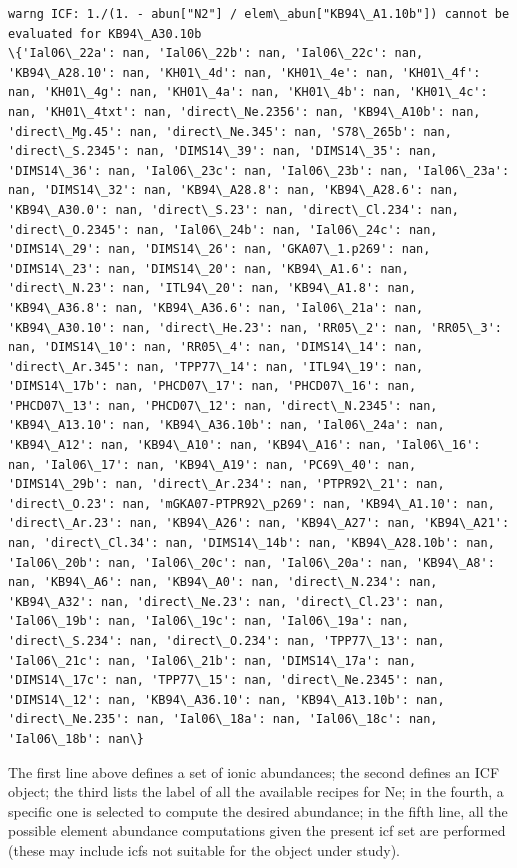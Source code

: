 \documentclass{report}
\begin{document}
    \begin{Verbatim}[commandchars=\\\{\}]
warng ICF: 1./(1. - abun["N2"] / elem\_abun["KB94\_A1.10b"]) cannot be evaluated for KB94\_A30.10b
\{'Ial06\_22a': nan, 'Ial06\_22b': nan, 'Ial06\_22c': nan, 'KB94\_A28.10': nan, 'KH01\_4d': nan, 'KH01\_4e': nan, 'KH01\_4f': nan, 'KH01\_4g': nan, 'KH01\_4a': nan, 'KH01\_4b': nan, 'KH01\_4c': nan, 'KH01\_4txt': nan, 'direct\_Ne.2356': nan, 'KB94\_A10b': nan, 'direct\_Mg.45': nan, 'direct\_Ne.345': nan, 'S78\_265b': nan, 'direct\_S.2345': nan, 'DIMS14\_39': nan, 'DIMS14\_35': nan, 'DIMS14\_36': nan, 'Ial06\_23c': nan, 'Ial06\_23b': nan, 'Ial06\_23a': nan, 'DIMS14\_32': nan, 'KB94\_A28.8': nan, 'KB94\_A28.6': nan, 'KB94\_A30.0': nan, 'direct\_S.23': nan, 'direct\_Cl.234': nan, 'direct\_O.2345': nan, 'Ial06\_24b': nan, 'Ial06\_24c': nan, 'DIMS14\_29': nan, 'DIMS14\_26': nan, 'GKA07\_1.p269': nan, 'DIMS14\_23': nan, 'DIMS14\_20': nan, 'KB94\_A1.6': nan, 'direct\_N.23': nan, 'ITL94\_20': nan, 'KB94\_A1.8': nan, 'KB94\_A36.8': nan, 'KB94\_A36.6': nan, 'Ial06\_21a': nan, 'KB94\_A30.10': nan, 'direct\_He.23': nan, 'RR05\_2': nan, 'RR05\_3': nan, 'DIMS14\_10': nan, 'RR05\_4': nan, 'DIMS14\_14': nan, 'direct\_Ar.345': nan, 'TPP77\_14': nan, 'ITL94\_19': nan, 'DIMS14\_17b': nan, 'PHCD07\_17': nan, 'PHCD07\_16': nan, 'PHCD07\_13': nan, 'PHCD07\_12': nan, 'direct\_N.2345': nan, 'KB94\_A13.10': nan, 'KB94\_A36.10b': nan, 'Ial06\_24a': nan, 'KB94\_A12': nan, 'KB94\_A10': nan, 'KB94\_A16': nan, 'Ial06\_16': nan, 'Ial06\_17': nan, 'KB94\_A19': nan, 'PC69\_40': nan, 'DIMS14\_29b': nan, 'direct\_Ar.234': nan, 'PTPR92\_21': nan, 'direct\_O.23': nan, 'mGKA07-PTPR92\_p269': nan, 'KB94\_A1.10': nan, 'direct\_Ar.23': nan, 'KB94\_A26': nan, 'KB94\_A27': nan, 'KB94\_A21': nan, 'direct\_Cl.34': nan, 'DIMS14\_14b': nan, 'KB94\_A28.10b': nan, 'Ial06\_20b': nan, 'Ial06\_20c': nan, 'Ial06\_20a': nan, 'KB94\_A8': nan, 'KB94\_A6': nan, 'KB94\_A0': nan, 'direct\_N.234': nan, 'KB94\_A32': nan, 'direct\_Ne.23': nan, 'direct\_Cl.23': nan, 'Ial06\_19b': nan, 'Ial06\_19c': nan, 'Ial06\_19a': nan, 'direct\_S.234': nan, 'direct\_O.234': nan, 'TPP77\_13': nan, 'Ial06\_21c': nan, 'Ial06\_21b': nan, 'DIMS14\_17a': nan, 'DIMS14\_17c': nan, 'TPP77\_15': nan, 'direct\_Ne.2345': nan, 'DIMS14\_12': nan, 'KB94\_A36.10': nan, 'KB94\_A13.10b': nan, 'direct\_Ne.235': nan, 'Ial06\_18a': nan, 'Ial06\_18c': nan, 'Ial06\_18b': nan\}
    \end{Verbatim}

    The first line above defines a set of ionic abundances; the second
defines an ICF object; the third lists the label of all the available
recipes for Ne; in the fourth, a specific one is selected to compute the
desired abundance; in the fifth line, all the possible element abundance
computations given the present icf set are performed (these may include
icfs not suitable for the object under study).
\end{document}
